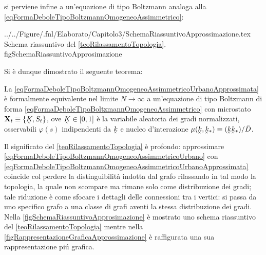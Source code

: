       si perviene infine a un'equazione di tipo Boltzmann analoga alla \ref{eqFormaDeboleTipoBoltzmannOmogeneoAssimmetrico}:

        {../../Figure/.fnl/Elaborato/Capitolo3/SchemaRiassuntivoApprossimazione.tex}
        {Schema riassuntivo del \cref{teoRilassamentoTopologia}.} 
        {\linewidth}{figSchemaRiassuntivoApprosimazione}

      Si è dunque dimostrato il seguente teorema:

      \begin{teo}
        \label{teoRilassamentoTopologia}
        La \ref{eqFormaDeboleTipoBoltzmannOmogeneoAssimmetricoUrbanoApprossimata} è formalmente equivalente nel limite \(N\to\infty\) a un'equazione di tipo Boltzmann di forma \ref{eqFormaDeboleTipoBoltzmannOmogeneoAssimmetrico} con microstato \(\mathbf X_t\equiv\{\underhat K,S_t\}\), ove \(\underhat K\in[0,1]\) è la variabile aleatoria dei gradi normalizzati, osservabili \(\varphi(s)\) indipendenti da \(\underhat k\) e nucleo d'interazione \(\mu(\underhat k,\underhat k_*)\equiv(\underhat k\underhat k_*)/\bar D\).
      \end{teo}
      
      Il significato del \cref{teoRilassamentoTopologia} è profondo: approssimare \ref{eqFormaDeboleTipoBoltzmannOmogeneoAssimmetricoUrbano} con \ref{eqFormaDeboleTipoBoltzmannOmogeneoAssimmetricoUrbanoApprossimata} coincide col perdere la distinguibilità indotta dal grafo rilassando in tal modo la topologia, la quale non scompare ma rimane solo come distribuzione dei gradi; tale riduzione è come sfocare i dettagli delle connessioni tra i vertici: si passa da uno specifico grafo a una classe di grafi aventi la stessa distribuzione dei gradi. Nella \cref{figSchemaRiassuntivoApprosimazione} è mostrato uno schema riassuntivo del \cref{teoRilassamentoTopologia} mentre nella \cref{figRappresentazioneGraficaApprossimazione} è raffigurata una sua rappresentazione piú grafica.


